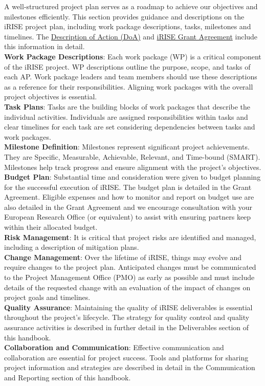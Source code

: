 \documentclass[
]{article}
\begin{document}
A well-structured project plan serves as a roadmap to achieve our
objectives and milestones efficiently. This section provides guidance
and descriptions on the iRISE project plan, including work package
descriptions, tasks, milestones and timelines. The \href{https://charitede.sharepoint.com/:b:/r/sites/iRISE/Shared\%20Documents/General/Grant\%20Agreement/GA\%20amendment\%20Sept.\%202023/iRISE_Annex1B_DoA_2023-09-25_v4_clean.pdf?csf=1\&web=1\&e=CGlIBC}{Description of
Action
(DoA)}
and \href{https://charitede.sharepoint.com/:f:/r/sites/iRISE/Shared\%20Documents/General/Grant\%20Agreement/AMD-101094853-4_Nov2023?csf=1\&web=1\&e=cuFpdE}{iRISE Grant
Agreement}
include this information in detail.\\
\textbf{Work Package Descriptions}: Each work package (WP) is a critical
component of the iRISE project. WP descriptions outline the purpose,
scope, and tasks of each AP. Work package leaders and team members
should use these descriptions as a reference for their responsibilities.
Aligning work packages with the overall project objectives is
essential.\\
\textbf{Task Plans}: Tasks are the building blocks of work packages that
describe the individual activities. Individuals are assigned
responsibilities within tasks and clear timelines for each task are set
considering dependencies between tasks and work packages.\\
\textbf{Milestone Definition}: Milestones represent significant project
achievements. They are Specific, Measurable, Achievable, Relevant, and
Time-bound (SMART). Milestones help track progress and ensure alignment
with the project's objectives.\\
\textbf{Budget Plan}: Substantial time and consideration were given to budget
planning for the successful execution of iRISE. The budget plan is
detailed in the Grant Agreement. Eligible expenses and how to monitor
and report on budget use are also detailed in the Grant Agreement and we
encourage consultation with your European Research Office (or
equivalent) to assist with ensuring partners keep within their allocated
budget.\\
\textbf{Risk Management}: It is critical that project risks are identified
and managed, including a description of mitigation plans.\\
\textbf{Change Management}: Over the lifetime of iRISE, things may evolve and
require changes to the project plan. Anticipated changes must be
communicated to the Project Management Office (PMO) as early as possible
and must include details of the requested change with an evaluation of
the impact of changes on project goals and timelines.\\
\textbf{Quality Assurance}: Maintaining the quality of iRISE deliverables is
essential throughout the project's lifecycle. The strategy for quality
control and quality assurance activities is described in further detail
in the Deliverables section of this handbook.\\
\textbf{Collaboration and Communication}: Effective communication and
collaboration are essential for project success. Tools and platforms for
sharing project information and strategies are described in detail in
the Communication and Reporting section of this handbook.
\end{document}
